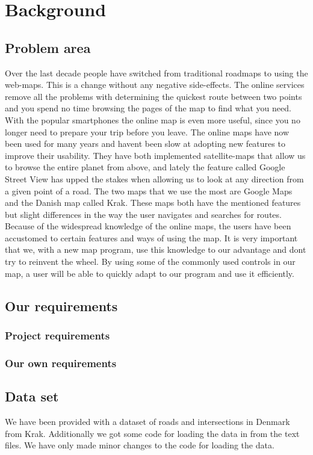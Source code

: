 \chapter{Background}
\section{Problem area}
Over the last decade people have switched from traditional roadmaps 
to using the web-maps. This is a change without any negative side-effects. 
The online services remove all the problems with determining the quickest 
route between two points and you spend no time browsing the pages of 
the map to find what you need. With the popular smartphones the online 
map is even more useful, since you no longer need to prepare your trip 
before you leave.
The online maps have now been used for many years and havent been slow 
at adopting new features to improve their usability. They have both 
implemented satellite-maps that allow us to browse the entire planet 
from above, and lately the feature called Google Street View has upped 
the stakes when allowing us to look at any direction from a given point 
of a road. The two maps that we use the most are Google Maps and the 
Danish map called Krak. These maps both have the mentioned features 
but slight differences in the way the user navigates and searches 
for routes.
Because of the widespread knowledge of the online maps, the users 
have been accustomed to certain features and ways of using the map. 
It is very important that we, with a new map program, use this knowledge 
to our advantage and dont try to reinvent the wheel. By using some 
of the commonly used controls in our map, a user will be able to quickly 
adapt to our program and use it efficiently. 
\section{Our requirements}
\subsection{Project requirements}
\subsection{Our own requirements}

\section{Data set}
We have been provided with a dataset of roads and intersections in Denmark 
from Krak. Additionally we got some code for loading the data in from the 
text files. We have only made minor changes to the code for loading the data.
